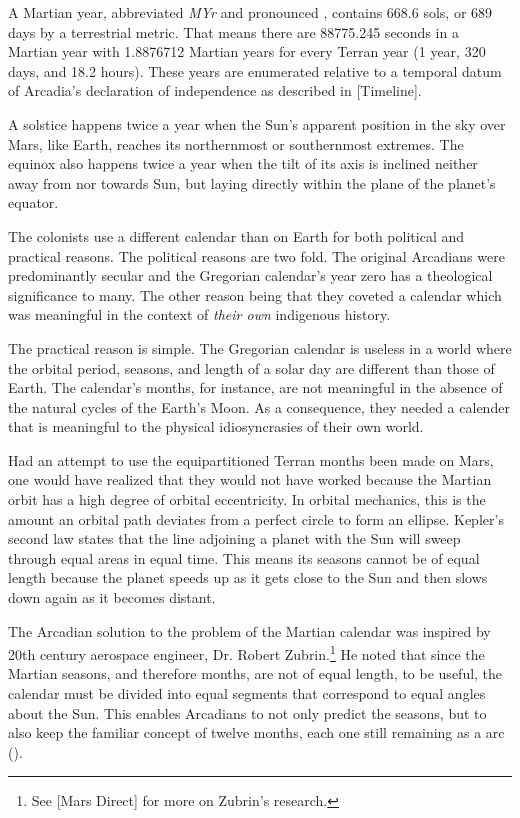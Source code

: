A Martian year, abbreviated {\it MYr} and pronounced , contains 668.6 sols, or 689 days by a terrestrial metric. That means there are 88775.245 seconds in a Martian year with 1.8876712 Martian years for every Terran year (1 year, 320 days, and 18.2 hours). These years are enumerated relative to a temporal datum of Arcadia's declaration of independence as described in [Timeline].


A solstice happens twice a year when the Sun's apparent position in the sky over Mars, like Earth, reaches its northernmost or southernmost extremes. The equinox also happens twice a year when the tilt of its axis is inclined neither away from nor towards Sun, but laying directly within the plane of the planet's equator.


The colonists use a different calendar than on Earth for both political and practical reasons. The political reasons are two fold. The original Arcadians were predominantly secular and the Gregorian calendar's year zero has a theological significance to many. The other reason being that they coveted a calendar which was meaningful in the context of {\it their own} indigenous history.

The practical reason is simple. The Gregorian calendar is useless in a world where the orbital period, seasons, and length of a solar day are different than those of Earth. The calendar's months, for instance, are not meaningful in the absence of the natural cycles of the Earth's Moon. As a consequence, they needed a calender that is meaningful to the physical idiosyncrasies of their own world.

Had an attempt to use the equipartitioned Terran months been made on Mars, one would have realized that they would not have worked because the Martian orbit has a high degree of orbital eccentricity. In orbital mechanics, this is the amount an orbital path deviates from a perfect circle to form an ellipse. Kepler's second law states that the line adjoining a planet with the Sun will sweep through equal areas in equal time. This means its seasons cannot be of equal length because the planet speeds up as it gets close to the Sun and then slows down again as it becomes distant.

The Arcadian solution to the problem of the Martian calendar was inspired by 20th century aerospace engineer, Dr. Robert Zubrin.\footnote{See [Mars Direct] for more on Zubrin's research.} He noted that since the Martian seasons, and therefore months, are not of equal length, to be useful, the calendar must be divided into equal segments that correspond to equal angles about the Sun. This enables Arcadians to not only predict the seasons, but to also keep the familiar concept of twelve months, each one still remaining as a  arc (). 

